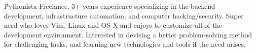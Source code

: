 

\begin{cvparagraph}

Pythonista Freelance. 3+ years experience specializing in the backend development, infrastructure automation, and computer hacking/security. Super nerd who loves Vim, Linux and OS X and enjoys to customize all of the development environment. Interested in devising a better problem-solving method for challenging tasks, and learning new technologies and tools if the need arises.
\end{cvparagraph}
